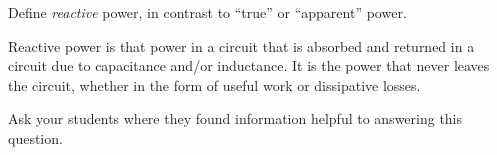 

Define {\it reactive} power, in contrast to ``true'' or ``apparent'' power.







Reactive power is that power in a circuit that is absorbed and returned in a circuit due to capacitance and/or inductance.  It is the power that never leaves the circuit, whether in the form of useful work or dissipative losses.







Ask your students where they found information helpful to answering this question.




